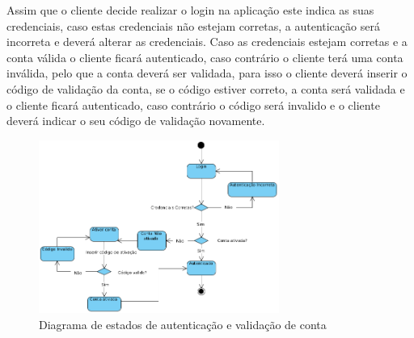 Assim que o cliente decide realizar o login na aplicação este indica as suas credenciais, caso estas credenciais não estejam corretas, a autenticação será incorreta e deverá alterar as credenciais. Caso as credenciais estejam corretas e a conta válida o cliente ficará autenticado, caso contrário o cliente terá uma conta inválida, pelo que a conta deverá ser validada, para  isso o cliente deverá inserir o código de validação da conta, se o código estiver correto, a conta será validada e o cliente ficará autenticado, caso contrário o código será invalido e o cliente deverá indicar o seu código de validação novamente.

\begin{figure}[htb]
    \centering
    \includegraphics[width=0.7\textwidth]{images/diagramas/estados/autenticacao.png}
    \caption{Diagrama de estados de autenticação e validação de conta}
    \label{fig:29}
\end{figure}
